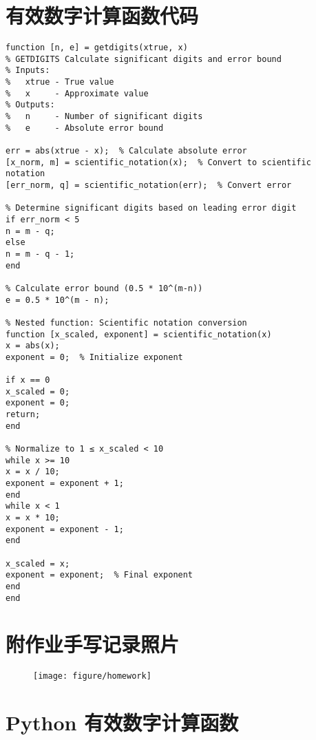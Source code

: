 \documentclass[UTF8]{ctexart}
\begin{document}
\section{有效数字计算函数代码}
\begin{lstlisting}[caption={MATLAB 有效数字计算函数 (getdigits.m)}, label=lst:getdigits]
function [n, e] = getdigits(xtrue, x)
% GETDIGITS Calculate significant digits and error bound
% Inputs:
%   xtrue - True value
%   x     - Approximate value
% Outputs:
%   n     - Number of significant digits
%   e     - Absolute error bound

err = abs(xtrue - x);  % Calculate absolute error
[x_norm, m] = scientific_notation(x);  % Convert to scientific notation
[err_norm, q] = scientific_notation(err);  % Convert error

% Determine significant digits based on leading error digit
if err_norm < 5
n = m - q;
else
n = m - q - 1;
end

% Calculate error bound (0.5 * 10^(m-n))
e = 0.5 * 10^(m - n);

% Nested function: Scientific notation conversion
function [x_scaled, exponent] = scientific_notation(x)
x = abs(x);
exponent = 0;  % Initialize exponent

if x == 0
x_scaled = 0;
exponent = 0;
return;
end

% Normalize to 1 ≤ x_scaled < 10
while x >= 10
x = x / 10;
exponent = exponent + 1;
end
while x < 1
x = x * 10;
exponent = exponent - 1;
end

x_scaled = x;
exponent = exponent;  % Final exponent
end
end
\end{lstlisting}



	\section{附作业手写记录照片}
	\begin{figure}[htbp]
		\centering
		\texttt{[image: figure/homework]}
		\label{fig:homework}
	\end{figure}
\section{Python 有效数字计算函数}
\end{document}

